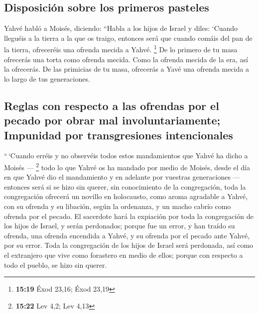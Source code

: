 \begin{paracol}{2}
\hypertarget{disposiciuxf3n-sobre-los-primeros-pasteles}{%
\subsection{Disposición sobre los primeros
pasteles}\label{disposiciuxf3n-sobre-los-primeros-pasteles}}

 Yahvé habló a Moisés, diciendo:  ``Habla
a los hijos de Israel y diles: `Cuando lleguéis a la tierra a la que os
traigo,  entonces será que cuando comáis del pan de la
tierra, ofreceréis una ofrenda mecida a Yahvé. \footnote{\textbf{15:19}
  Éxod 23,16; Éxod 23,19}  De lo primero de tu masa
ofrecerás una torta como ofrenda mecida. Como la ofrenda mecida de la
era, así la ofrecerás.  De las primicias de tu masa,
ofrecerás a Yavé una ofrenda mecida a lo largo de tus generaciones.

\hypertarget{reglas-con-respecto-a-las-ofrendas-por-el-pecado-por-obrar-mal-involuntariamente-impunidad-por-transgresiones-intencionales}{%
\subsection{Reglas con respecto a las ofrendas por el pecado por obrar
mal involuntariamente; Impunidad por transgresiones
intencionales}\label{reglas-con-respecto-a-las-ofrendas-por-el-pecado-por-obrar-mal-involuntariamente-impunidad-por-transgresiones-intencionales}}

 ``\,`Cuando erréis y no observéis todos estos
mandamientos que Yahvé ha dicho a Moisés --- \footnote{\textbf{15:22}
  Lev 4,2; Lev 4,13}  todo lo que Yahvé os ha mandado por
medio de Moisés, desde el día en que Yahvé dio el mandamiento y en
adelante por vuestras generaciones ---  entonces será si
se hizo sin querer, sin conocimiento de la congregación, toda la
congregación ofrecerá un novillo en holocausto, como aroma agradable a
Yahvé, con su ofrenda y su libación, según la ordenanza, y un macho
cabrío como ofrenda por el pecado.  El sacerdote hará la
expiación por toda la congregación de los hijos de Israel, y serán
perdonados; porque fue un error, y han traído su ofrenda, una ofrenda
encendida a Yahvé, y su ofrenda por el pecado ante Yahvé, por su error.
 Toda la congregación de los hijos de Israel será
perdonada, así como el extranjero que vive como forastero en medio de
ellos; porque con respecto a todo el pueblo, se hizo sin querer.


\end{paracol}

